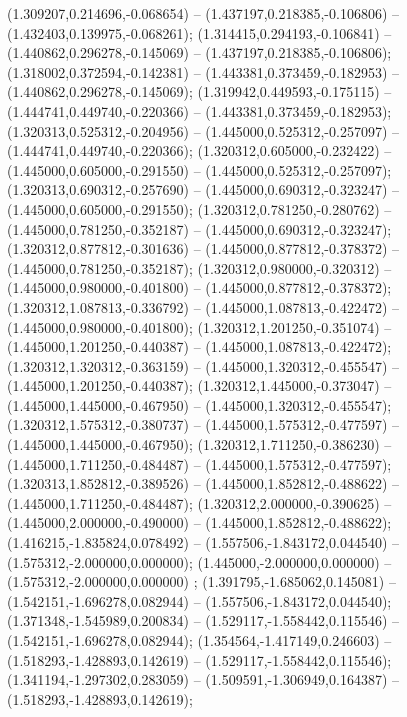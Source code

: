  (1.309207,0.214696,-0.068654) -- (1.437197,0.218385,-0.106806) -- (1.432403,0.139975,-0.068261);
 (1.314415,0.294193,-0.106841) -- (1.440862,0.296278,-0.145069) -- (1.437197,0.218385,-0.106806);
 (1.318002,0.372594,-0.142381) -- (1.443381,0.373459,-0.182953) -- (1.440862,0.296278,-0.145069);
 (1.319942,0.449593,-0.175115) -- (1.444741,0.449740,-0.220366) -- (1.443381,0.373459,-0.182953);
 (1.320313,0.525312,-0.204956) -- (1.445000,0.525312,-0.257097) -- (1.444741,0.449740,-0.220366);
 (1.320312,0.605000,-0.232422) -- (1.445000,0.605000,-0.291550) -- (1.445000,0.525312,-0.257097);
 (1.320313,0.690312,-0.257690) -- (1.445000,0.690312,-0.323247) -- (1.445000,0.605000,-0.291550);
 (1.320312,0.781250,-0.280762) -- (1.445000,0.781250,-0.352187) -- (1.445000,0.690312,-0.323247);
 (1.320312,0.877812,-0.301636) -- (1.445000,0.877812,-0.378372) -- (1.445000,0.781250,-0.352187);
 (1.320312,0.980000,-0.320312) -- (1.445000,0.980000,-0.401800) -- (1.445000,0.877812,-0.378372);
 (1.320312,1.087813,-0.336792) -- (1.445000,1.087813,-0.422472) -- (1.445000,0.980000,-0.401800);
 (1.320312,1.201250,-0.351074) -- (1.445000,1.201250,-0.440387) -- (1.445000,1.087813,-0.422472);
 (1.320312,1.320312,-0.363159) -- (1.445000,1.320312,-0.455547) -- (1.445000,1.201250,-0.440387);
 (1.320312,1.445000,-0.373047) -- (1.445000,1.445000,-0.467950) -- (1.445000,1.320312,-0.455547);
 (1.320312,1.575312,-0.380737) -- (1.445000,1.575312,-0.477597) -- (1.445000,1.445000,-0.467950);
 (1.320312,1.711250,-0.386230) -- (1.445000,1.711250,-0.484487) -- (1.445000,1.575312,-0.477597);
 (1.320313,1.852812,-0.389526) -- (1.445000,1.852812,-0.488622) -- (1.445000,1.711250,-0.484487);
 (1.320312,2.000000,-0.390625) -- (1.445000,2.000000,-0.490000) -- (1.445000,1.852812,-0.488622);
 (1.416215,-1.835824,0.078492) -- (1.557506,-1.843172,0.044540) -- (1.575312,-2.000000,0.000000);
 (1.445000,-2.000000,0.000000) -- (1.575312,-2.000000,0.000000) ;
 (1.391795,-1.685062,0.145081) -- (1.542151,-1.696278,0.082944) -- (1.557506,-1.843172,0.044540);
 (1.371348,-1.545989,0.200834) -- (1.529117,-1.558442,0.115546) -- (1.542151,-1.696278,0.082944);
 (1.354564,-1.417149,0.246603) -- (1.518293,-1.428893,0.142619) -- (1.529117,-1.558442,0.115546);
 (1.341194,-1.297302,0.283059) -- (1.509591,-1.306949,0.164387) -- (1.518293,-1.428893,0.142619);
